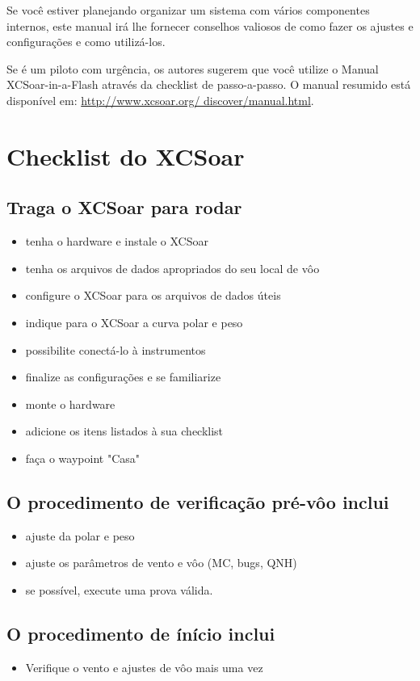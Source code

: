 Se você estiver planejando organizar um sistema com vários componentes internos, este manual irá lhe fornecer conselhos valiosos de como fazer os ajustes e configurações e como utilizá-los.

Se é um piloto com urgência, os autores sugerem que você utilize o Manual XCSoar-in-a-Flash através da checklist de passo-a-passo.  O manual resumido está disponível em: 
 \url{http://www.xcsoar.org/
discover/manual.html}.



\section{Checklist do XCSoar}

\subsection*{Traga o XCSoar para rodar}
\begin{itemize}
\item tenha o hardware e instale o XCSoar
\item tenha os arquivos de dados apropriados do seu local de vôo
\item configure o XCSoar para os arquivos de dados úteis
\item indique para o XCSoar a curva polar e peso
\item possibilite conectá-lo à instrumentos
\item finalize as configurações e se familiarize
\item monte o hardware
\item adicione os itens listados à sua checklist
\item faça o waypoint "Casa"
\end{itemize}

\subsection*{O procedimento de verificação pré-vôo inclui}
\begin{itemize}
\item ajuste da polar e peso
\item ajuste os parâmetros de vento e vôo (MC, bugs, QNH)
\item se possível, execute uma prova válida.
\end{itemize}

\subsection*{O procedimento de ínício inclui}
\begin{itemize}
\item Verifique o vento e ajustes de vôo mais uma vez
\end{itemize}
\vspace{2em}

